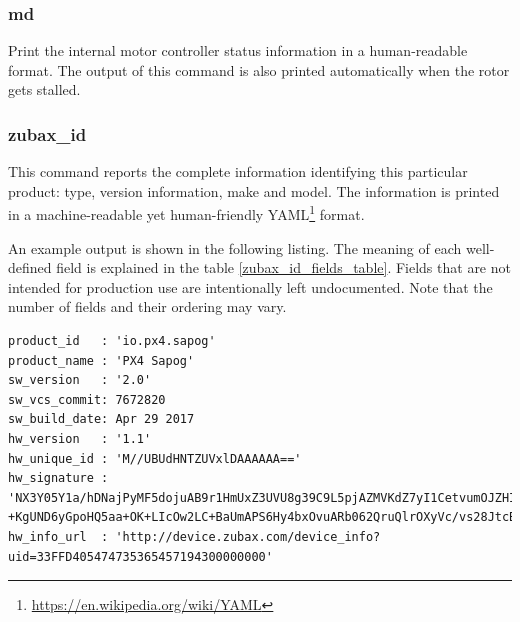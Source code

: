 \documentclass{zubaxdoc}
\begin{document}
\subsubsection{md}

Print the internal motor controller status information in a human-readable format.
The output of this command is also printed automatically when the rotor gets stalled.

\subsubsection{zubax\_id}\label{sec:cli_zubax_id}

This command reports the complete information identifying this particular product:
type, version information, make and model.
The information is printed in a machine-readable yet human-friendly
YAML\footnote{\url{https://en.wikipedia.org/wiki/YAML}} format.

An example output is shown in the following listing.
The meaning of each well-defined field is explained in the table \ref{zubax_id_fields_table}.
Fields that are not intended for production use are intentionally left undocumented.
Note that the number of fields and their ordering may vary.

\begin{verbatim}
product_id   : 'io.px4.sapog'
product_name : 'PX4 Sapog'
sw_version   : '2.0'
sw_vcs_commit: 7672820
sw_build_date: Apr 29 2017
hw_version   : '1.1'
hw_unique_id : 'M//UBUdHNTZUVxlDAAAAAA=='
hw_signature : 'NX3Y05Y1a/hDNajPyMF5dojuAB9r1HmUxZ3UVU8g39C9L5pjAZMVKdZ7yI1CetvumOJZHIjRYkHOBmMAEKvRU/3mpG\
+KgUND6yGpoHQ5aa+OK+LIcOw2LC+BaUmAPS6Hy4bxOvuARb062QruQlrOXyVc/vs28JtcBzOZo/b/OxY='
hw_info_url  : 'http://device.zubax.com/device_info?uid=33FFD405474735365457194300000000'
\end{verbatim}
\end{document}
